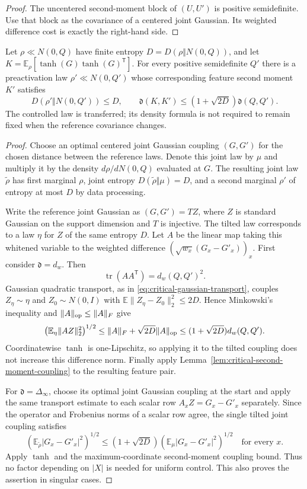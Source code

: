 \begin{proof}
The uncentered second-moment block of $(U,U')$ is positive semidefinite.
Use that block as the covariance of a centered joint Gaussian. Its
weighted difference cost is exactly the right-hand side.
\end{proof}

\begin{theorem}
\label{thm:critical-bures-transfer}
Let $\rho\ll N(0,Q)$ have finite entropy
$D=D(\rho\Vert N(0,Q))$, and let
$K=\mathbb E_\rho[\tanh(G)\tanh(G)^{\mathsf T}]$.
For every positive semidefinite $Q'$ there is a preactivation law
$\rho'\ll N(0,Q')$ whose corresponding feature second moment $K'$
satisfies
\[
 D(\rho'\Vert N(0,Q'))\le D,\qquad
 \mathfrak d(K,K')\le(1+\sqrt{2D})\mathfrak d(Q,Q').
\]
The controlled law is transferred; its density formula is not required
to remain fixed when the reference covariance changes.
\end{theorem}

\begin{proof}
Choose an optimal centered joint Gaussian coupling $(G,G')$ for the
chosen distance between the reference laws. Denote this joint law by $\mu$ and multiply it by
the density $d\rho/dN(0,Q)$ evaluated at $G$. The resulting joint
law $\widetilde\rho$ has first marginal $\rho$, joint entropy
$D(\widetilde\rho\Vert\mu)=D$, and a second marginal $\rho'$
of entropy at most $D$ by data processing.

Write the reference joint Gaussian as $(G,G')=TZ$, where $Z$ is
standard Gaussian on the support dimension and $T$ is injective.
The tilted law corresponds to a law $\eta$ for $Z$ of the same
entropy $D$. Let $A$ be the linear map taking this whitened variable
to the weighted difference $(\sqrt{w_x}(G_x-G'_x))_x$. First consider
$\mathfrak d=d_w$. Then
\[
 \operatorname{tr}(AA^{\mathsf T})=d_w(Q,Q')^2.
\]
Gaussian quadratic transport, as in
\eqref{eq:critical-gaussian-transport}, couples $Z_\eta\sim\eta$
and $Z_0\sim N(0,I)$ with
$\mathbb E\|Z_\eta-Z_0\|_2^2\le2D$. Hence Minkowski's inequality
and $\|A\|_{\rm op}\le\|A\|_F$ give
\[
 \bigl(\mathbb E_\eta\|AZ\|_2^2\bigr)^{1/2}
 \le\|A\|_F+\sqrt{2D}\|A\|_{\rm op}
 \le(1+\sqrt{2D})d_w(Q,Q').
\]
Coordinatewise $\tanh$ is one-Lipschitz, so applying it to the
tilted coupling does not increase this difference norm. Finally apply
Lemma~\ref{lem:critical-second-moment-coupling} to the resulting
feature pair.

For $\mathfrak d=\Delta_\infty$, choose its optimal joint Gaussian
coupling at the start and apply the same transport estimate to each
scalar row $A_xZ=G_x-G'_x$ separately. Since the operator and Frobenius
norms of a scalar row agree, the single tilted joint coupling satisfies
\[
 (\mathbb E_{\widetilde\rho}|G_x-G'_x|^2)^{1/2}
 \le(1+\sqrt{2D})(\mathbb E_\mu|G_x-G'_x|^2)^{1/2}
 \quad\text{for every }x.
\]
Apply $\tanh$ and the maximum-coordinate second-moment coupling
bound. Thus no factor depending on $|X|$ is needed for uniform control.
This also proves the assertion in singular cases.
\end{proof}

